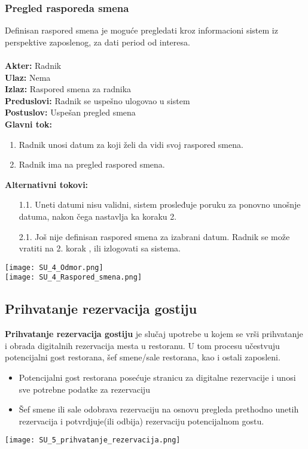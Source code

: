 \documentclass{article}
\begin{document}
\subsubsection{Pregled rasporeda smena}
Definisan raspored smena je moguće pregledati kroz informacioni sistem iz perspektive zaposlenog, za dati period od interesa.\\\\
\textbf{Akter:} Radnik\\
\textbf{Ulaz:} Nema\\
\textbf{Izlaz:} Raspored smena za radnika\\
\textbf{Preduslovi:} Radnik se uspešno ulogovao u sistem\\
\textbf{Postuslov:} Uspešan pregled smena\\
\textbf{Glavni tok:}
\begin{enumerate}
\item Radnik unosi datum za koji želi da vidi svoj raspored smena.
\item Radnik ima na pregled raspored smena.
\end{enumerate}
\textbf{Alternativni tokovi:}\\
\begin{itemize}
\item [1.1.] Uneti datumi nisu validni, sistem prosleđuje poruku za ponovno unošnje datuma, nakon čega nastavlja ka koraku 2.
\item[2.1.] Još nije definisan raspored smena za izabrani datum. Radnik se može vratiti na 2. korak , ili izlogovati sa sistema.
\end{itemize}

\texttt{[image: SU\_4\_Odmor.png]}\\
\texttt{[image: SU\_4\_Raspored\_smena.png]}\\


\subsection{Prihvatanje rezervacija gostiju}
\textbf{Prihvatanje rezervacija gostiju} je slučaj upotrebe u kojem se vrši prihvatanje i obrada digitalnih rezervacija mesta u restoranu. U tom procesu učestvuju potencijalni gost restorana, šef smene/sale restorana, kao i ostali zaposleni.\\

\begin{itemize}
\item Potencijalni gost restorana posećuje stranicu za digitalne rezervacije i unosi sve potrebne podatke za rezervaciju
\item Šef smene ili sale odobrava rezervaciju na osnovu pregleda prethodno unetih rezervacija i potvrdjuje(ili odbija) rezervaciju potencijalnom gostu.
\end{itemize}
\vspace{1cm}
\texttt{[image: SU\_5\_prihvatanje\_rezervacija.png]}
\end{document}
